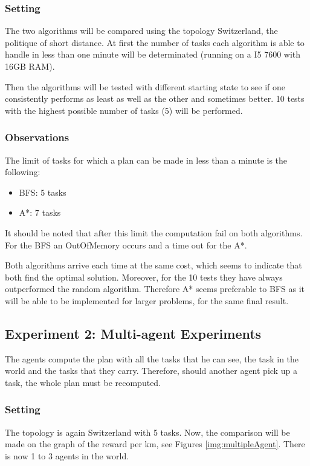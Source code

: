 \documentclass[11pt]{article}
\begin{document}
\subsubsection{Setting}
The two algorithms will be compared using the topology Switzerland, the politique of short distance. At first the number of tasks each algorithm is able to handle in less than one minute will be determinated (running on a I5 7600 with 16GB RAM).

Then the algorithms will be tested with different starting state to see if one consistently performs as least as well as the other and sometimes better. 10 tests with the highest possible number of tasks (5) will be performed. 
\subsubsection{Observations}
The limit of tasks for which a plan can be made in less than a minute is the following:
\begin{itemize}
  \item BFS: 5 tasks
  \item A*: 7 tasks
\end{itemize}
It should be noted that after this limit the computation fail on both algorithms. For the BFS an OutOfMemory occurs and a time out for the A*.

Both algorithms arrive each time at the same cost, which seems to indicate that both find the optimal solution. Moreover, for the 10 tests they have always outperformed the random algorithm. Therefore A* seems preferable to BFS as it will be able to be implemented for larger problems, for the same final result.

\subsection{Experiment 2: Multi-agent Experiments}
The agents compute the plan with all the tasks that he can see, the task in the world and the tasks that they carry. Therefore, should another agent pick up a task, the whole plan must be recomputed.  
\subsubsection{Setting}
The topology is again Switzerland with 5 tasks. Now, the comparison will be made on the graph of the reward per km, see Figures \ref{img:multipleAgent}. There is now 1 to 3 agents in the world. 
\end{document}
